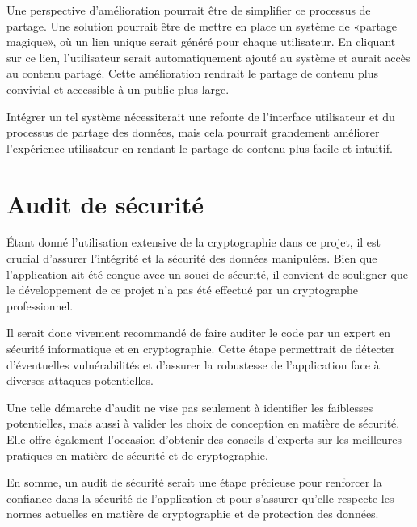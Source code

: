 Une perspective d'amélioration pourrait être de simplifier ce processus de partage. Une solution pourrait être de mettre en place un système de «partage magique», où un lien unique serait généré pour chaque utilisateur. En cliquant sur ce lien, l'utilisateur serait automatiquement ajouté au système et aurait accès au contenu partagé. Cette amélioration rendrait le partage de contenu plus convivial et accessible à un public plus large.

Intégrer un tel système nécessiterait une refonte de l'interface utilisateur et du processus de partage des données, mais cela pourrait grandement améliorer l'expérience utilisateur en rendant le partage de contenu plus facile et intuitif.

\section{Audit de sécurité}

Étant donné l'utilisation extensive de la cryptographie dans ce projet, il est crucial d'assurer l'intégrité et la sécurité des données manipulées. Bien que l'application ait été conçue avec un souci de sécurité, il convient de souligner que le développement de ce projet n'a pas été effectué par un cryptographe professionnel.

Il serait donc vivement recommandé de faire auditer le code par un expert en sécurité informatique et en cryptographie. Cette étape permettrait de détecter d'éventuelles vulnérabilités et d'assurer la robustesse de l'application face à diverses attaques potentielles.

Une telle démarche d'audit ne vise pas seulement à identifier les faiblesses potentielles, mais aussi à valider les choix de conception en matière de sécurité. Elle offre également l'occasion d'obtenir des conseils d'experts sur les meilleures pratiques en matière de sécurité et de cryptographie.

En somme, un audit de sécurité serait une étape précieuse pour renforcer la confiance dans la sécurité de l'application et pour s'assurer qu'elle respecte les normes actuelles en matière de cryptographie et de protection des données.